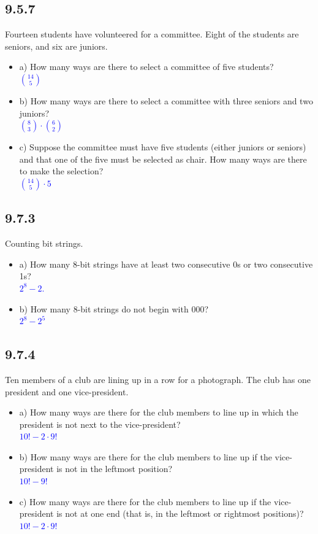 \documentclass{article}
\begin{document}
\subsection*{9.5.7} Fourteen students have volunteered for a committee. Eight of the students are seniors, and six are juniors.
\begin{itemize}
    \item a) How many ways are there to select a committee of five students? \\
    \textcolor{blue}{$\binom{14}{5}$}
    \item b) How many ways are there to select a committee with three seniors and two juniors? \\
    \textcolor{blue}{$\binom{8}{3} \cdot \binom {6}{2}$}
    \item c) Suppose the committee must have five students (either juniors or seniors) and that one of the five must be selected as chair. How many ways are there to make the selection? \\
    \textcolor{blue}{$\binom{14}{5} \cdot 5$}
\end{itemize}

\subsection*{9.7.3} Counting bit strings.
\begin{itemize}
    \item a) How many 8-bit strings have at least two consecutive 0s or two consecutive 1s?\\
    \textcolor{blue}{$2^8 - 2$.}
    \item b) How many 8-bit strings do not begin with 000? \\
    \textcolor{blue}{$2^8 - 2^5$}
\end{itemize}

\subsection*{9.7.4} Ten members of a club are lining up in a row for a photograph. The club has one president and one vice-president.
\begin{itemize}
    \item a) How many ways are there for the club members to line up in which the president is not next to the vice-president? \\
    \textcolor{blue}{$10! - 2 \cdot 9!$}
    \item b) How many ways are there for the club members to line up if the vice-president is not in the leftmost position? \\
    \textcolor{blue}{$10! - 9!$}
    \item c) How many ways are there for the club members to line up if the vice-president is not at one end (that is, in the leftmost or rightmost positions)? \\
    \textcolor{blue}{$10! - 2 \cdot 9!$}
\end{itemize}
\end{document}
